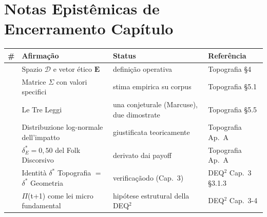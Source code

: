 \section{Notas Epistêmicas de Encerramento
Capítulo}\label{note-epistemiche-di-chiusura-capítulo}

{\def\LTcaptype{none} %
{\small\begin{longtable}[]{@{}
  >{\raggedright\arraybackslash}p{}
  >{\raggedright\arraybackslash}p{}
  >{\raggedright\arraybackslash}p{}
  >{\raggedright\arraybackslash}p{}@{}}
\toprule\noalign{}
\begin{minipage}[b]{\linewidth}\raggedright
\#
\end{minipage} & \begin{minipage}[b]{\linewidth}\raggedright
Afirmação
\end{minipage} & \begin{minipage}[b]{\linewidth}\raggedright
Status
\end{minipage} & \begin{minipage}[b]{\linewidth}\raggedright
Referência
\end{minipage} \\
\midrule\noalign{}
\endhead
\bottomrule\noalign{}
\endlastfoot
1 & Spazio \(\mathcal{D}\) e vetor ético \(\mathbf{E}\) & \Proved{}
definição operativa & Topografia \S{}4 \\
2 & Matrice \(\Sigma\) con valori specifici & \Proved{} stima empirica
su corpus & Topografia \S{}5.1 \\
3 & Le Tre Leggi & \Proved{} una conjeturale (Marcuse), due dimostrate
& Topografia \S{}5.5 \\
4 & Distribuzione log-normale dell'impatto & \Proved{} giustificata
teoricamente & Topografia Ap.~A \\
5 & \(\delta^*_E = 0{,}50\) del Folk Discorsivo & \Proved{} derivato dai
payoff & Topografia Ap.~A \\
6 & Identità \(\delta^*\) Topografia \(=\) \(\delta^*\) Geometria &
\Proved{} verificaçãodo (Cap.~3) & DEQ$^2$ Cap.~3 \S{}3.1.3 \\
7 & $\Pi$(t+1) come lei micro fundamental & \Hypoth{} hipótese estrutural
della DEQ$^2$ & DEQ$^2$ Cap.~3-4 \\
\end{longtable}}
}



